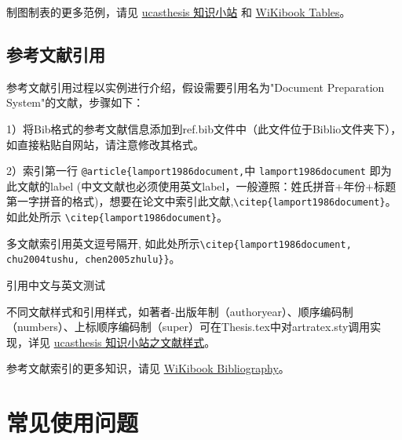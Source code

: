 {制图制表的更多范例，请见 \href{https://github.com/mohuangrui/ucasthesis/wiki}{ucasthesis 知识小站} 和 \href{https://en.wikibooks.org/wiki/LaTeX/Tables}{WiKibook Tables}。

\subsection{参考文献引用}

参考文献引用过程以实例进行介绍，假设需要引用名为"Document Preparation System"的文献，步骤如下：

1）将Bib格式的参考文献信息添加到ref.bib文件中（此文件位于Biblio文件夹下），如直接粘贴自网站，请注意修改其格式。

2）索引第一行 \verb|@article{lamport1986document,|中 \verb|lamport1986document| 即为此文献的label (中文文献也必须使用英文label，一般遵照：姓氏拼音+年份+标题第一字拼音的格式)，想要在论文中索引此文献,\verb|\citep{lamport1986document}|。如此处所示 \verb|\citep{lamport1986document}|。

多文献索引用英文逗号隔开, 如此处所示\verb|\citep{lamport1986document, chu2004tushu, chen2005zhulu}}|。

引用中文\citet{chen2005zhulu,niu2013zonghe}与英文\citep{walls2013drought}测试



不同文献样式和引用样式，如著者-出版年制（authoryear）、顺序编码制（numbers）、上标顺序编码制（super）可在Thesis.tex中对artratex.sty调用实现，详见 \href{https://github.com/mohuangrui/ucasthesis/wiki}{ucasthesis 知识小站之文献样式}。


参考文献索引的更多知识，请见 \href{https://en.wikibooks.org/wiki/LaTeX/Bibliography_Management}{WiKibook Bibliography}。\nocite{*}%

\section{常见使用问题}\label{sec:qa}

}
